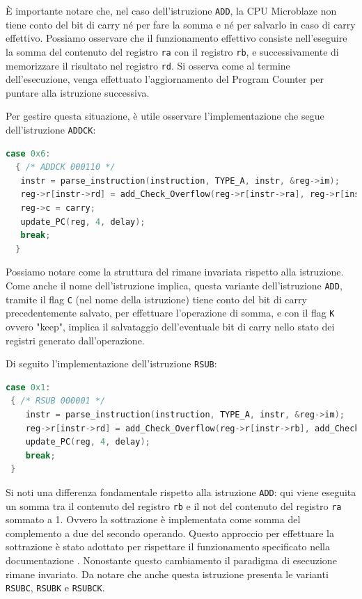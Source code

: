 È importante notare che, nel caso dell'istruzione \texttt{ADD}, la CPU Microblaze non tiene conto del bit di carry né per fare la somma e né per salvarlo in caso di carry effettivo.
Possiamo osservare che il funzionamento effettivo consiste nell'eseguire la somma del contenuto del registro \texttt{ra} con il registro \texttt{rb}, e successivamente di memorizzare il risultato nel registro \texttt{rd}.
Si osserva come al termine dell'esecuzione, venga effettuato l'aggiornamento del Program Counter per puntare alla istruzione successiva.

\vspace{0.3cm}

\noindent Per gestire questa situazione, è utile osservare l'implementazione che segue dell'istruzione \texttt{ADDCK}:
\begin{lstlisting}[language=C]
  case 0x6:
  { /* ADDCK 000110 */
   instr = parse_instruction(instruction, TYPE_A, instr, &reg->im);
   reg->r[instr->rd] = add_Check_Overflow(reg->r[instr->ra], reg->r[instr->rb] + reg->c, &carry);
   reg->c = carry;
   update_PC(reg, 4, delay);
   break;
  }
\end{lstlisting}
Possiamo notare come la struttura del rimane invariata rispetto alla istruzione. Come anche il nome dell'istruzione implica, questa variante dell'istruzione \texttt{ADD}, tramite il flag \texttt{C} (nel nome della istruzione) tiene conto del bit di carry precedentemente salvato, per effettuare l'operazione di somma, e con il flag \texttt{K} ovvero "keep", implica il salvataggio dell'eventuale bit di carry nello stato dei registri generato dall'operazione.

\noindent Di seguito l'implementazione dell'istruzione \texttt{RSUB}: 
\begin{lstlisting}[language=C]
 case 0x1:
 { /* RSUB 000001 */
    instr = parse_instruction(instruction, TYPE_A, instr, &reg->im);
    reg->r[instr->rd] = add_Check_Overflow(reg->r[instr->rb], add_Check_Overflow(~reg->r[instr->ra], 1, &carry), &carry);
    update_PC(reg, 4, delay);
    break;
 }
\end{lstlisting}
Si noti una differenza fondamentale rispetto alla istruzione \texttt{ADD}: qui viene eseguita un somma tra il contenuto del registro \texttt{rb} e il not del contenuto del registro \texttt{ra} sommato a 1. Ovvero la sottrazione è implementata come somma del complemento a due del secondo operando. Questo approccio per effettuare la sottrazione è stato adottato per rispettare il funzionamento specificato nella documentazione \cite{sitoMicroblaze}.
Nonostante questo cambiamento il paradigma di esecuzione rimane invariato. Da notare che anche questa istruzione presenta le varianti \texttt{RSUBC}, \texttt{RSUBK} e \texttt{RSUBCK}.


